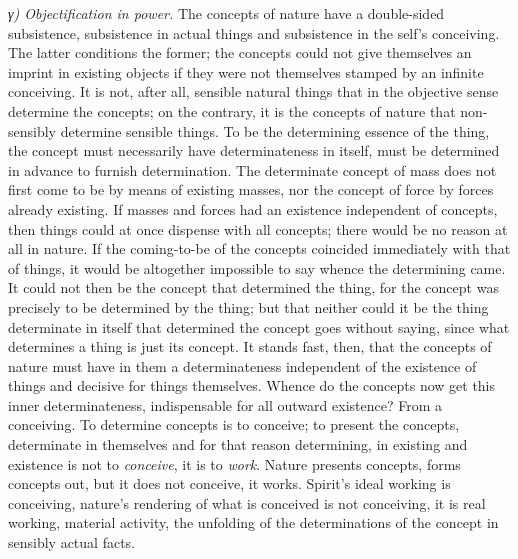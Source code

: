 \documentclass[12pt,a4paper]{book}
\newcommand{\subrunin}[1]{\emph{#1}\hspace{0.4em}}
\begin{document}
\subrunin{γ) Objectification in power.} The concepts of nature have a double-sided
subsistence, subsistence in actual things and subsistence in the self's conceiving.
The latter conditions the former; the concepts could not give themselves an imprint
in existing objects if they were not themselves stamped by an infinite conceiving.
It is not, after all, sensible natural things that in the objective sense determine
the concepts; on the contrary, it is the concepts of nature that non-sensibly
determine sensible things. To be the determining essence of the thing, the concept
must necessarily have determinateness in itself, must be determined in advance to
furnish determination. The determinate concept of mass does not first come to be by
means of existing masses, nor the concept of force by forces already existing. If
masses and forces had an existence independent of concepts, then things could at
once dispense with all concepts; there would be no reason at all in nature. If the
coming-to-be of the concepts coincided immediately with that of things, it would be
altogether impossible to say whence the determining came. It could not then be the
concept that determined the thing, for the concept was precisely to be determined by
the thing; but that neither could it be the thing determinate in itself that
determined the concept goes without saying, since what determines a thing is just
its concept. It stands fast, then, that the concepts of nature must have in them a
determinateness independent of the existence of things and decisive for things
themselves. Whence do the concepts now get this inner determinateness, indispensable
for all outward existence? From a conceiving. To determine concepts is to conceive;
to present the concepts, determinate in themselves and for that reason determining,
in existing and existence is not to \emph{conceive}, it is to \emph{work}. Nature
presents concepts, forms concepts out, but it does not conceive, it works. Spirit's
ideal working
is conceiving, nature's rendering of what is conceived is not conceiving, it
is real working, material activity, the unfolding of the determinations of the
concept in sensibly actual facts.
\end{document}

